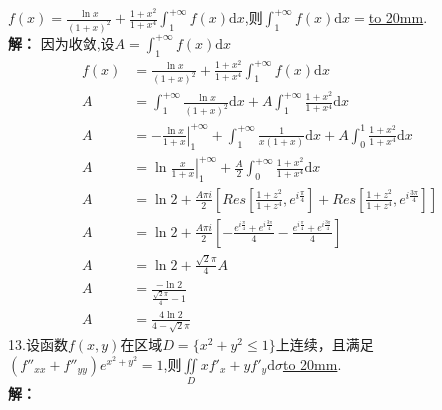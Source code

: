 \documentclass[a4paper]{article}
\begin{document}
$f(x)=\frac{\ln x}{(1+x)^2}+\frac{1+x^2}{1+x^4}\int_{1}^{+\infty}f(x)\mathrm{d}x$,则$\int_{1}^{+\infty} f(x)\mathrm{d}x=$\underline{\hbox to 20mm{}}.\\
\textbf{解：}
因为收敛,设$A=\int_{1}^{+\infty} f(x)\mathrm{d}x$
\begin{align*}
    f(x)&=\frac{\ln x}{(1+x)^2}+\frac{1+x^2}{1+x^4}\int_{1}^{+\infty}f(x)\mathrm{d}x\\
    A &=\int_{1}^{+\infty} \frac{\ln x}{(1+x)^2} \mathrm{d}x +A\int_{1}^{+\infty} \frac{1+x^2}{1+x^4}\mathrm{d}x\\
    A&=\left. -\frac{\ln x}{1+x} \right|_{1}^{+\infty} +\int_{1}^{+\infty} \frac{1}{x(1+x)}\mathrm{d} x +A\int_{0}^{1}\frac{1+x^2}{1+x^4}\mathrm{d} x \\
    A&=\left. \ln \frac{x}{1+x}\right|_{1}^{+\infty} +\frac{A}{2}\int_{0}^{+\infty} \frac{1+x^2}{1+x^4}\mathrm{d} x\\
    A&=\ln 2 +\frac{A\pi i}{2}\left[Res\left[\frac{1+z^2}{1+z^4},e^{i\frac{\pi}{4}}\right] +Res\left[\frac{1+z^2}{1+z^4},e^{i\frac{3\pi}{4}}\right]  \right]\\
    A&=\ln 2 +\frac{A\pi i}{2}\left[-\frac{e^{i\frac{ \pi }{4}}+e^{i\frac{ 3\pi }{4}}}{4}-\frac{e^{i\frac{ \pi }{4}}+e^{i\frac{ 3\pi }{4}}}{4} \right]\\
    A&=\ln 2 +\frac{\sqrt{2}\pi}{4}A\\
    A&=\frac{-\ln 2}{\frac{\sqrt{2}\pi}{4}-1}\\
    A&=\frac{4\ln 2}{4-\sqrt{2}\pi}
\end{align*}
\newpage
\noindent
13.设函数$f(x,y)$在区域$D=\{x^2+y^2\le 1 \}$上连续，且满足\\
	$(f''_{xx}+f''_{yy})e^{x^2+y^2}=1$,则$\iint \limits_D xf'_{x}+yf'_{y}\mathrm{d}\sigma$\underline{\hbox to 20mm{}}.\\
\textbf{解：}
\end{document}
